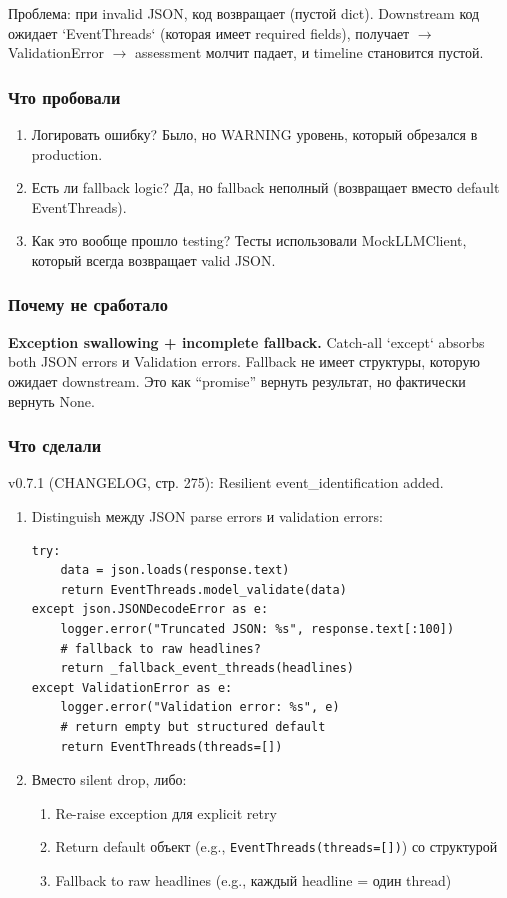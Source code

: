Проблема: при invalid JSON, код возвращает \texttt{{}} (пустой dict). Downstream код ожидает `EventThreads` (которая имеет required fields), получает \texttt{{}} $\to$ ValidationError $\to$ assessment молчит падает, и timeline становится пустой.

\subsubsection*{Что пробовали}
\begin{enumerate}
\item Логировать ошибку? Было, но WARNING уровень, который обрезался в production.
\item Есть ли fallback logic? Да, но fallback неполный (возвращает {} вместо default EventThreads).
\item Как это вообще прошло testing? Тесты использовали MockLLMClient, который всегда возвращает valid JSON.
\end{enumerate}

\subsubsection*{Почему не сработало}
\textbf{Exception swallowing + incomplete fallback.} Catch-all `except` absorbs both JSON errors и Validation errors. Fallback \texttt{{}} не имеет структуры, которую ожидает downstream. Это как ``promise'' вернуть результат, но фактически вернуть None.

\subsubsection*{Что сделали}
v0.7.1 (CHANGELOG, стр. 275): Resilient event\_identification added.

\begin{enumerate}
\item Distinguish между JSON parse errors и validation errors:
\begin{verbatim}
try:
    data = json.loads(response.text)
    return EventThreads.model_validate(data)
except json.JSONDecodeError as e:
    logger.error("Truncated JSON: %s", response.text[:100])
    # fallback to raw headlines?
    return _fallback_event_threads(headlines)
except ValidationError as e:
    logger.error("Validation error: %s", e)
    # return empty but structured default
    return EventThreads(threads=[])
\end{verbatim}

\item Вместо silent drop, либо:
  \begin{enumerate}
  \item Re-raise exception для explicit retry
  \item Return default объект (e.g., \texttt{EventThreads(threads=[])}) со структурой
  \item Fallback to raw headlines (e.g., каждый headline = один thread)
  \end{enumerate}
\end{enumerate}

